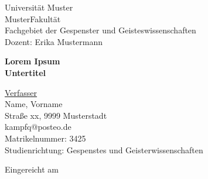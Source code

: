 
%



\thispagestyle{empty}
\begin{flushleft}
Universität Muster\\
MusterFakultät\\
Fachgebiet der Gespenster und Geisteswissenschaften\\
\vspace{0,5cm}
Dozent: Erika Mustermann
\end{flushleft}
\begin{center}
   
    \vspace{7cm}
   
   
    {\Huge \textbf{Lorem Ipsum}}\\ %
    \vspace*{0,5cm}
    {\Large \textbf{Untertitel}}\\
    
\end{center}
\vspace{7cm}
\begin{flushleft}


\underline{Verfasser}\\
\vspace{0,5cm}
Name, Vorname\\
Straße xx, 9999 Musterstadt\\
kampfq@posteo.de\\
Matrikelnummer: 3425\\
Studienrichtung: Gespenstes und Geisterwissenschaften

	\vspace{1cm}

Eingereicht am\\

\end{flushleft}
\newpage



